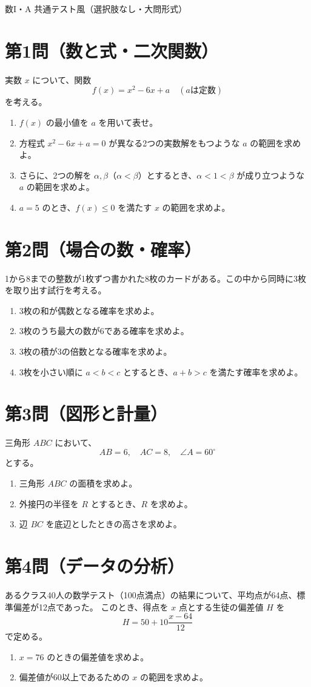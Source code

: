 \documentclass[a4paper,12pt]{ltjsarticle}
\begin{document}
\begin{center}
{\LARGE 数I・A 共通テスト風（選択肢なし・大問形式）}
\end{center}

\vspace{1em}

\section*{第1問（数と式・二次関数）}
実数 $x$ について、関数
\[
f(x)=x^2-6x+a \quad (a\text{は定数})
\]
を考える。
\begin{enumerate}[label=\arabic*.]
  \item $f(x)$ の最小値を $a$ を用いて表せ。
  \item 方程式 $x^2-6x+a=0$ が異なる2つの実数解をもつような $a$ の範囲を求めよ。
  \item さらに、2つの解を $\alpha,\beta$（$\alpha<\beta$）とするとき、$\alpha<1<\beta$ が成り立つような $a$ の範囲を求めよ。
  \item $a=5$ のとき、$f(x)\le 0$ を満たす $x$ の範囲を求めよ。
\end{enumerate}

\section*{第2問（場合の数・確率）}
1から8までの整数が1枚ずつ書かれた8枚のカードがある。この中から同時に3枚を取り出す試行を考える。
\begin{enumerate}[label=\arabic*.]
  \item 3枚の和が偶数となる確率を求めよ。
  \item 3枚のうち最大の数が6である確率を求めよ。
  \item 3枚の積が3の倍数となる確率を求めよ。
  \item 3枚を小さい順に $a<b<c$ とするとき、$a+b>c$ を満たす確率を求めよ。
\end{enumerate}

\section*{第3問（図形と計量）}
三角形 $ABC$ において、
\[
AB=6,\quad AC=8,\quad \angle A=60^\circ
\]
とする。
\begin{enumerate}[label=\arabic*.]
  \item 三角形 $ABC$ の面積を求めよ。
  \item 外接円の半径を $R$ とするとき、$R$ を求めよ。
  \item 辺 $BC$ を底辺としたときの高さを求めよ。
\end{enumerate}

\section*{第4問（データの分析）}
あるクラス40人の数学テスト（100点満点）の結果について、平均点が64点、標準偏差が12点であった。  
このとき、得点を $x$ 点とする生徒の偏差値 $H$ を
\[
H=50+10\frac{x-64}{12}
\]
で定める。
\begin{enumerate}[label=\arabic*.]
  \item $x=76$ のときの偏差値を求めよ。
  \item 偏差値が60以上であるための $x$ の範囲を求めよ。
\end{enumerate}
\end{document}
